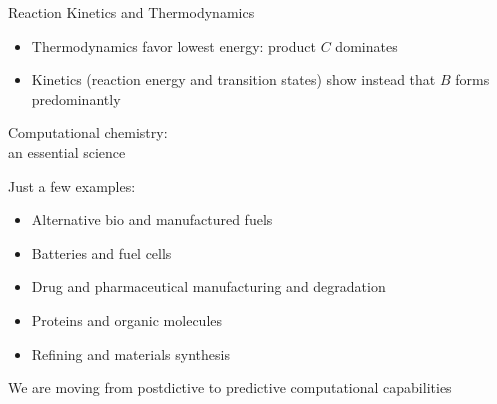 \begin{frame}{Reaction Kinetics and Thermodynamics}

    \begin{multicols}{2}
        
        \columnbreak
        \begin{itemize}
         \item Thermodynamics favor lowest energy: product $C$ dominates
         \item Kinetics (reaction energy and transition states) show instead that $B$ forms predominantly
        \end{itemize}
        
    \end{multicols}
\end{frame}



\begin{frame}{Computational chemistry:\\ an essential science}

Just a few examples:

\vspace{0.5cm}

 \begin{itemize}
  \item Alternative bio and manufactured fuels
  \item Batteries and fuel cells
  \item Drug and pharmaceutical manufacturing and degradation
  \item Proteins and organic molecules
  \item Refining and materials synthesis
 \end{itemize}
 
 \vspace{0.5cm}
 
 We are moving from postdictive to predictive computational capabilities
 
\end{frame}

